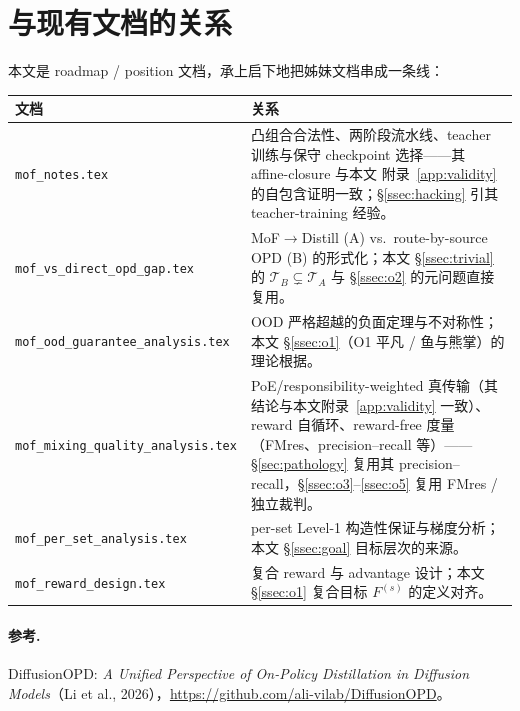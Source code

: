 \documentclass[11pt,a4paper]{article}
\theoremstyle{definition}
\begin{document}
\section{与现有文档的关系}
\label{sec:relation}

本文是 roadmap / position 文档，承上启下地把姊妹文档串成一条线：

\begin{center}
\renewcommand{\arraystretch}{1.4}
\footnotesize
\begin{tabular}{@{}p{5.2cm}p{8.3cm}@{}}
\toprule
\textbf{文档} & \textbf{关系} \\
\midrule
\texttt{mof\_notes.tex} &
凸组合合法性、两阶段流水线、teacher 训练与保守 checkpoint 选择——其 affine-closure 与本文
附录~\ref{app:validity} 的自包含证明一致；\S\ref{ssec:hacking} 引其 teacher-training 经验。 \\
\texttt{mof\_vs\_direct\_opd\_gap.tex} &
MoF$\to$Distill (A) vs.\ route-by-source OPD (B) 的形式化；本文 \S\ref{ssec:trivial} 的
$\mathcal{T}_B\subsetneq\mathcal{T}_A$ 与 \S\ref{ssec:o2} 的元问题直接复用。 \\
\texttt{mof\_ood\_guarantee\_analysis.tex} &
OOD 严格超越的负面定理与不对称性；本文 \S\ref{ssec:o1}（O1 平凡 / 鱼与熊掌）的理论根据。 \\
\texttt{mof\_mixing\_quality\_analysis.tex} &
PoE/responsibility-weighted 真传输（其结论与本文附录~\ref{app:validity} 一致）、reward
自循环、reward-free 度量（FMres、precision--recall 等）——\S\ref{sec:pathology} 复用其
precision--recall，\S\ref{ssec:o3}--\ref{ssec:o5} 复用 FMres / 独立裁判。 \\
\texttt{mof\_per\_set\_analysis.tex} &
per-set Level-1 构造性保证与梯度分析；本文 \S\ref{ssec:goal} 目标层次的来源。 \\
\texttt{mof\_reward\_design.tex} &
复合 reward 与 advantage 设计；本文 \S\ref{ssec:o1} 复合目标 $F^{(s)}$ 的定义对齐。 \\
\bottomrule
\end{tabular}
\end{center}

\paragraph{参考.} DiffusionOPD: \emph{A Unified Perspective of On-Policy Distillation in
Diffusion Models}（Li et al., 2026），\url{https://github.com/ali-vilab/DiffusionOPD}。
\end{document}
